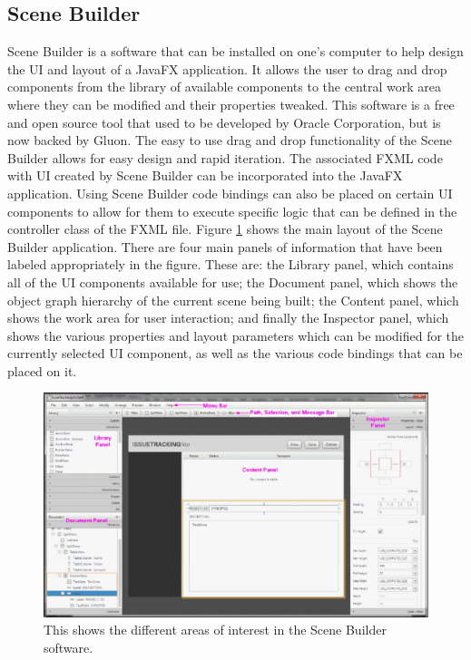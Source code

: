 \subsection{Scene Builder}
Scene Builder is a software that can be installed on one's computer to help design the UI and layout of a JavaFX application. It allows the user to drag and drop components from the library of available components to the central work area where they can be modified and their properties tweaked. This software is a free and open source tool that used to be developed by Oracle Corporation, but is now backed by Gluon. The easy to use drag and drop functionality of the Scene Builder allows for easy design and rapid iteration. The associated FXML code with UI created by Scene Builder can be incorporated into the JavaFX application. Using Scene Builder code bindings can also be placed on certain UI components to allow for them to execute specific logic that can be defined in the controller class of the FXML file. Figure \ref{fig:sceneBuilderWindow} shows the main layout of the Scene Builder application. There are four main panels of information that have been labeled appropriately in the figure. These are: the Library panel, which contains all of the UI components available for use; the Document panel, which shows the object graph hierarchy of the current scene being built; the Content panel, which shows the work area for user interaction; and finally the Inspector panel, which shows the various properties and layout parameters which can be modified for the currently selected UI component, as well as the various code bindings that can be placed on it. 

\begin{figure}[th]
\centering
\includegraphics[scale=0.35]{Figures/sceneBuilderWindow.JPG}
\caption[Scene Builder]{This shows the different areas of interest in the Scene Builder software.}
\label{fig:sceneBuilderWindow}
\end{figure}




